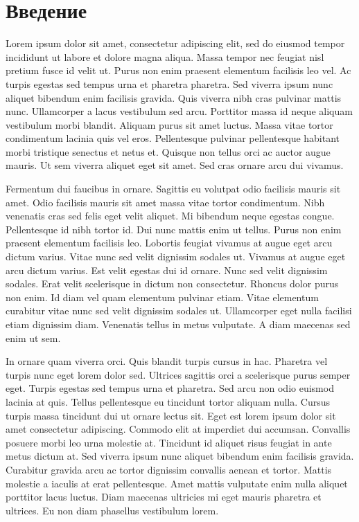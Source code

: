 \documentclass[a4paper,12pt]{report}
\begin{document}
\maketitle

\restoregeometry %
\chapter{Введение}

Lorem ipsum dolor sit amet, consectetur adipiscing elit, sed do eiusmod tempor incididunt ut labore et dolore magna aliqua. Massa tempor nec feugiat nisl pretium fusce id velit ut. Purus non enim praesent elementum facilisis leo vel. Ac turpis egestas sed tempus urna et pharetra pharetra. Sed viverra ipsum nunc aliquet bibendum enim facilisis gravida. Quis viverra nibh cras pulvinar mattis nunc. Ullamcorper a lacus vestibulum sed arcu. Porttitor massa id neque aliquam vestibulum morbi blandit. Aliquam purus sit amet luctus. Massa vitae tortor condimentum lacinia quis vel eros. Pellentesque pulvinar pellentesque habitant morbi tristique senectus et netus et. Quisque non tellus orci ac auctor augue mauris. Ut sem viverra aliquet eget sit amet. Sed cras ornare arcu dui vivamus.

Fermentum dui faucibus in ornare. Sagittis eu volutpat odio facilisis mauris sit amet. Odio facilisis mauris sit amet massa vitae tortor condimentum. Nibh venenatis cras sed felis eget velit aliquet. Mi bibendum neque egestas congue. Pellentesque id nibh tortor id. Dui nunc mattis enim ut tellus. Purus non enim praesent elementum facilisis leo. Lobortis feugiat vivamus at augue eget arcu dictum varius. Vitae nunc sed velit dignissim sodales ut. Vivamus at augue eget arcu dictum varius. Est velit egestas dui id ornare. Nunc sed velit dignissim sodales. Erat velit scelerisque in dictum non consectetur. Rhoncus dolor purus non enim. Id diam vel quam elementum pulvinar etiam. Vitae elementum curabitur vitae nunc sed velit dignissim sodales ut. Ullamcorper eget nulla facilisi etiam dignissim diam. Venenatis tellus in metus vulputate. A diam maecenas sed enim ut sem.

In ornare quam viverra orci. Quis blandit turpis cursus in hac. Pharetra vel turpis nunc eget lorem dolor sed. Ultrices sagittis orci a scelerisque purus semper eget. Turpis egestas sed tempus urna et pharetra. Sed arcu non odio euismod lacinia at quis. Tellus pellentesque eu tincidunt tortor aliquam nulla. Cursus turpis massa tincidunt dui ut ornare lectus sit. Eget est lorem ipsum dolor sit amet consectetur adipiscing. Commodo elit at imperdiet dui accumsan. Convallis posuere morbi leo urna molestie at. Tincidunt id aliquet risus feugiat in ante metus dictum at. Sed viverra ipsum nunc aliquet bibendum enim facilisis gravida. Curabitur gravida arcu ac tortor dignissim convallis aenean et tortor. Mattis molestie a iaculis at erat pellentesque. Amet mattis vulputate enim nulla aliquet porttitor lacus luctus. Diam maecenas ultricies mi eget mauris pharetra et ultrices. Eu non diam phasellus vestibulum lorem.
\end{document}
